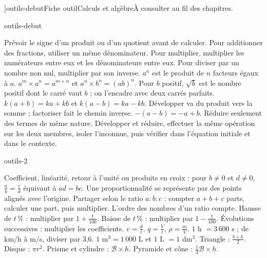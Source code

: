 \editionPage[\pdfbookmark[0]{Fiches outils}{bm-outils-debut-parent}]{outils-debut}{Fiche outil}{Calculs et algèbre}{À consulter au fil des chapitres.}
\begin{blocEdition}{outils-debut}

Prévoir le signe d’un produit ou d’un quotient avant de calculer. Pour additionner des fractions, utiliser un même dénominateur. Pour multiplier, multiplier les numérateurs entre eux et les dénominateurs entre eux. Pour diviser par un nombre non nul, multiplier par son inverse.
$a^n$ est le produit de $n$ facteurs égaux à $a$. $a^m\times a^n=a^{m+n}$ et $a^n\times b^n=(ab)^n$. Pour $b$ positif, $\sqrt b$ est le nombre positif dont le carré vaut $b$ ; on l’encadre avec deux carrés parfaits.
$k(a+b)=ka+kb$ et $k(a-b)=ka-kb$. Développer va du produit vers la somme ; factoriser fait le chemin inverse. $-(a-b)=-a+b$. Réduire seulement des termes de même nature.
Développer et réduire, effectuer la même opération sur les deux membres, isoler l’inconnue, puis vérifier dans l’équation initiale et dans le contexte.
\end{blocEdition}
\begin{blocEdition}{outils-2}

Coefficient, linéarité, retour à l’unité ou produits en croix : pour $b\ne0$ et $d\ne0$, $\frac ab=\frac cd$ équivaut à $ad=bc$. Une proportionnalité se représente par des points alignés avec l’origine.
Partager selon le ratio $a:b:c$ : compter $a+b+c$ parts, calculer une part, puis multiplier. L’ordre des nombres d’un ratio compte.
Hausse de $t\,\%$ : multiplier par $1+\frac t{100}$. Baisse de $t\,\%$ : multiplier par $1-\frac t{100}$. Évolutions successives : multiplier les coefficients.
$v=\frac dt$, $q=\frac Vt$, $\rho=\frac mV$. $1$ h $=3\,600$ s ; de km/h à m/s, diviser par 3,6. $1$ m$^3=1\,000$ L et $1$ L $=1$ dm$^3$.
Triangle : $\frac{b\times h}2$. Disque : $\pi r^2$. Prisme et cylindre : $\mathcal B\times h$. Pyramide et cône : $\frac13\mathcal B\times h$.
\end{blocEdition}

